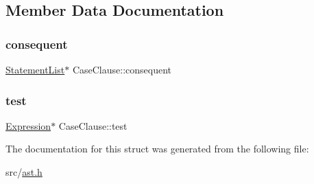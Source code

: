 \subsection{Member Data Documentation}
\mbox{\label{struct_case_clause_a3e6914411610d1893b61172521e11288}} 
\subsubsection{\texorpdfstring{consequent}{consequent}}
{\footnotesize\ttfamily \hyperlink{struct_statement_list}{Statement\+List}$\ast$ Case\+Clause\+::consequent}

\mbox{\label{struct_case_clause_a80b6f256f3d9910250e4b8433ea75d7f}} 
\subsubsection{\texorpdfstring{test}{test}}
{\footnotesize\ttfamily \hyperlink{struct_expression}{Expression}$\ast$ Case\+Clause\+::test}



The documentation for this struct was generated from the following file\+:\begin{DoxyCompactItemize}
\item 
src/\hyperlink{ast_8h}{ast.\+h}\end{DoxyCompactItemize}
